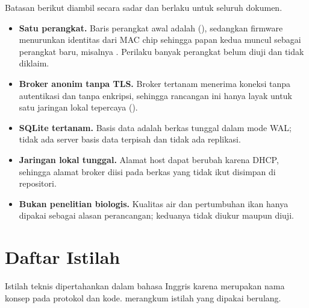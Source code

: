 Batasan berikut diambil secara sadar dan berlaku untuk seluruh dokumen.
\begin{itemize}[leftmargin=*,itemsep=2pt]
  \item \textbf{Satu perangkat.} Baris perangkat awal adalah \code{\SeedDevice}
        (\SeedDeviceName), sedangkan firmware menurunkan identitas dari MAC chip
        sehingga papan kedua muncul sebagai perangkat baru, misalnya
        \code{\DeviceExample}. Perilaku banyak perangkat belum diuji dan tidak
        diklaim.
  \item \textbf{Broker anonim tanpa TLS.} Broker tertanam menerima koneksi tanpa
        autentikasi dan tanpa enkripsi, sehingga rancangan ini hanya layak untuk
        satu jaringan lokal tepercaya ().
  \item \textbf{SQLite tertanam.} Basis data adalah berkas tunggal \code{\DbFile}
        dalam mode WAL; tidak ada server basis data terpisah dan tidak ada
        replikasi.
  \item \textbf{Jaringan lokal tunggal.} Alamat host dapat berubah karena DHCP,
        sehingga alamat broker diisi pada berkas  yang tidak ikut
        disimpan di repositori.
  \item \textbf{Bukan penelitian biologis.} Kualitas air dan pertumbuhan ikan hanya
        dipakai sebagai alasan perancangan; keduanya tidak diukur maupun diuji.
\end{itemize}

\section{Daftar Istilah}

Istilah teknis dipertahankan dalam bahasa Inggris karena merupakan nama konsep pada
protokol dan kode.  merangkum istilah yang dipakai berulang.


